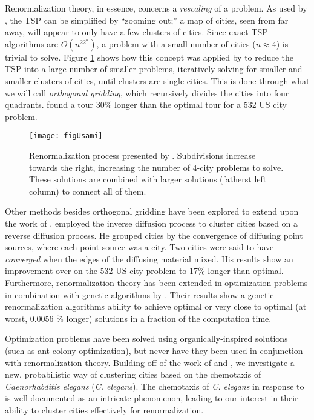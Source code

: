 \documentclass[10pt]{article}
\begin{document}
\par Renormalization theory, in essence, concerns a \textit{rescaling} of a problem. As used by \citet{Yoshiyuki1995}, the TSP can be simplified by ``zooming out;'' a map of cities, seen from far away, will appear to only have a few clusters of cities. Since exact TSP algorithms are $O(n^22^n)$, a problem with a small number of cities ($n \approx 4$) is trivial to solve. Figure \ref{fig:grid} shows how this concept was applied by \citet{Yoshiyuki1995} to reduce the TSP into a large number of smaller problems, iteratively solving for smaller and smaller clusters of cities, until clusters are single cities. This is done through what we will call \emph{orthogonal gridding}, which recursively divides the cities into four quadrants. \citet{Yoshiyuki1995} found a tour 30\% longer than the optimal tour for a 532 US city problem.

\begin{figure}[H]
  \centering
  \texttt{[image: figUsami]}
  \caption{Renormalization process presented by \citet{Yoshiyuki1995}. Subdivisions increase towards the right,
    increasing the number of 4-city problems to solve. These solutions are combined with larger solutions 
    (fatherst left column) to connect all of them.}
  \label{fig:grid}
\end{figure}

\par Other methods besides orthogonal gridding have been explored to extend upon the work of \citet{Yoshiyuki1995}. \citet{Ugajin2002} employed the inverse diffusion process to cluster cities based on a reverse diffusion process. He grouped cities by the convergence of diffusing point sources, where each point source was a city. Two cities were said to have \emph{converged} when the edges of the diffusing material mixed. His results show an improvement over \citet{Yoshiyuki1995} on the 532 US city problem to 17\% longer than optimal. Furthermore, renormalization theory has been extended in optimization problems in combination with genetic algorithms by \citet{Houdayer1999}. Their results show a genetic-renormalization algorithms ability to achieve optimal or very close to optimal (at worst, 0.0056 \% longer) solutions in a fraction of the computation time.

\par Optimization problems have been solved using organically-inspired solutions (such as ant colony optimization), but never have they been used in conjunction with renormalization theory.
Building off of the work of \citet{Yoshiyuki1995} and \citet{Ugajin2002}, we investigate  
a new, probabilistic way of clustering cities based on the chemotaxis of \textit{Caenorhabditis 
elegans} (\textit{C. elegans}). The chemotaxis of \textit{C. elegans} in response to  is well documented as an intricate phenomenon, leading to our interest in their ability to cluster cities effectively for renormalization.
\end{document}
